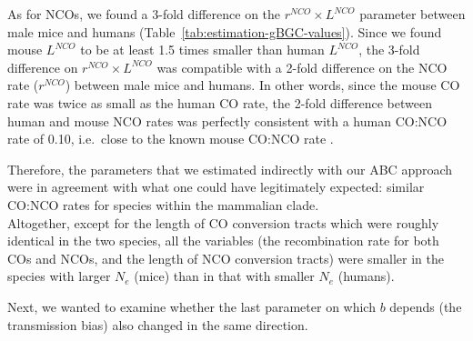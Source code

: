 As for NCOs, we found a 3-fold difference on the $r^{NCO} \times L^{NCO}$ parameter between male mice and humans (Table~\ref{tab:estimation-gBGC-values}).
Since we found mouse $L^{NCO}$ to be at least 1.5 times smaller than human $L^{NCO}$, the 3-fold difference on $r^{NCO} \times L^{NCO}$ was compatible with a 2-fold difference on the NCO rate ($r^{NCO}$) between male mice and humans. 
In other words, since the mouse CO rate was twice as small as the human CO rate, the 2-fold difference between human and mouse NCO rates was perfectly consistent with a human CO:NCO rate of 0.10, i.e.\ close to the known mouse CO:NCO rate \citep{cole2010comprehensive}.

Therefore, the parameters that we estimated indirectly with our ABC approach were in agreement with what one could have legitimately expected: similar CO:NCO rates for species within the mammalian clade.\\


Altogether, except for the length of CO conversion tracts which were roughly identical in the two species, all the variables (the recombination rate for both COs and NCOs, and the length of NCO conversion tracts) were smaller in the species with larger $N_e$ (mice) than in that with smaller $N_e$ (humans).

Next, we wanted to examine whether the last parameter on which $b$ depends (the transmission bias) also changed in the same direction.





